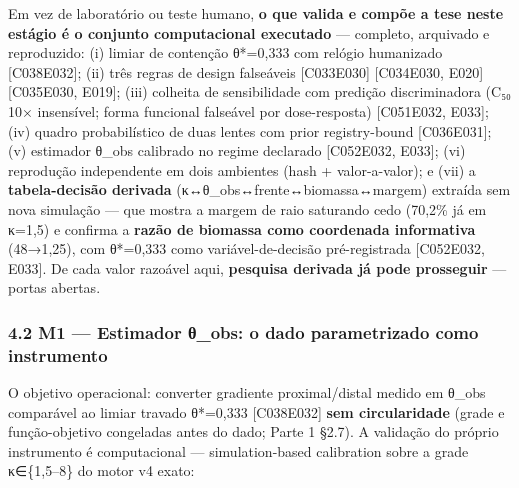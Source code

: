 \documentclass[
  10pt,
]{article}
\begin{document}
Em vez de laboratório ou teste humano, \textbf{o que valida e compõe a
tese neste estágio é o conjunto computacional executado} --- completo,
arquivado e reproduzido: (i) limiar de contenção θ*=0,333 com relógio
humanizado {[}C038\textbar E032{]}; (ii) três regras de design
falseáveis {[}C033\textbar E030{]} {[}C034\textbar E030, E020{]}
{[}C035\textbar E030, E019{]}; (iii) colheita de sensibilidade com
predição discriminadora (C₅₀ 10× insensível; forma funcional falseável
por dose-resposta) {[}C051\textbar E032, E033{]}; (iv) quadro
probabilístico de duas lentes com prior registry-bound
{[}C036\textbar E031{]}; (v) estimador θ\_obs calibrado no regime
declarado {[}C052\textbar E032, E033{]}; (vi) reprodução independente em
dois ambientes (hash + valor-a-valor); e (vii) a \textbf{tabela-decisão
derivada} (κ↔θ\_obs↔frente↔biomassa↔margem) extraída sem nova simulação
--- que mostra a margem de raio saturando cedo (70,2\% já em κ=1,5) e
confirma a \textbf{razão de biomassa como coordenada informativa}
(48→1,25), com θ*=0,333 como variável-de-decisão pré-registrada
{[}C052\textbar E032, E033{]}. De cada valor razoável aqui,
\textbf{pesquisa derivada já pode prosseguir} --- portas abertas.

\hypertarget{m1-estimador-ux3b8_obs-o-dado-parametrizado-como-instrumento}{%
\subsubsection{4.2 M1 --- Estimador θ\_obs: o dado parametrizado como
instrumento}\label{m1-estimador-ux3b8_obs-o-dado-parametrizado-como-instrumento}}

O objetivo operacional: converter gradiente proximal/distal medido em
θ\_obs comparável ao limiar travado θ*=0,333 {[}C038\textbar E032{]}
\textbf{sem circularidade} (grade e função-objetivo congeladas antes do
dado; Parte 1 §2.7). A validação do próprio instrumento é computacional
--- simulation-based calibration sobre a grade κ∈\{1,5--8\} do motor v4
exato:
\end{document}
